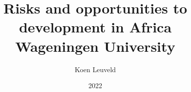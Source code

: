 



\title{
	{Risks and opportunities to development in Africa\\}
	{\large Wageningen University}\\
}
\author{Koen Leuveld}
\date{2022}

\maketitle
\tableofcontents
\todototoc
\listoftodos


 


















